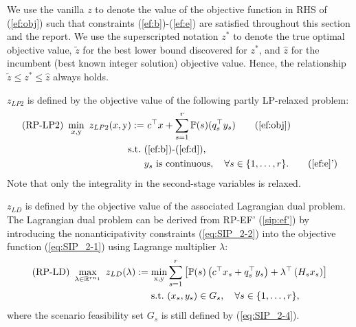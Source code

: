 We use the vanilla $z$ to denote the value of the objective function in RHS of (\ref{ef:obj}) such that constraints (\ref{ef:b})-(\ref{ef:e}) are satisfied throughout this section and the report. We use the superscripted notation $z^*$ to denote the true optimal objective value, $\tilde{z}$ for the best lower bound discovered for $z^*$, and $\hat{z}$ for the incumbent (best known integer solution) objective value. Hence, the relationship $\tilde{z}\le z^*\le\hat{z}$ always holds.

$z_{LP2}$ is defined by the objective value of the following partly LP-relaxed problem:
\begin{subequations}\label{ef-lp2}
	\begin{align}
	\textrm{(RP-LP2) }\min_{x,\mathrm{y}}\ z_{LP2}(x,\mathrm{y}):=&\ c^{\top}x + \sum_{s=1}^{r}\PP(s) (q_s^{\top}y_s) \tag{\ref{ef:obj}}\\ 
	\mathrm{s.t.}\ &\textrm{(\ref{ef:b})-(\ref{ef:d})}, \nonumber \\
	& y_s \textrm{ is continuous} ,\quad\forall s\in\{1,\ldots,r\}. \tag{\ref{ef:e}'}
	\end{align}
\end{subequations}
Note that only the integrality in the second-stage variables is relaxed.

$z_{LD}$ is defined by the objective value of the associated Lagrangian dual problem. The Lagrangian dual problem can be derived from RP-EF' (\ref{sip:ef'}) by introducing the nonanticipativity constraints (\ref{eq:SIP_2-2}) into the objective function (\ref{eq:SIP_2-1}) using Lagrange multiplier $\lambda$:
\begin{subequations}\label{ld}
	\begin{align}
	\textrm{(RP-LD) }\max_{\lambda\in\mathbb{R}^{rn_1}}\ z_{LD}(\lambda) :=\min_{\mathrm{x},\mathrm{y}}  &\sum_{s=1}^{r}\left[\operatorname*{\mathbb{P}}(s)\left(c^{\top}x_s+q_s^{\top}y_s\right)+\lambda^\top \left(H_s x_s\right)\right] \label{ld:obj}\\ 
	\mathrm{s.t.}\ & (x_s,y_s)\in G_s,\quad \forall s\in\{1,\ldots,r\},	 \label{ld:b}
	\end{align}
\end{subequations}
where the scenario feasibility set $G_s$ is still defined by (\ref{eq:SIP_2-4}).

